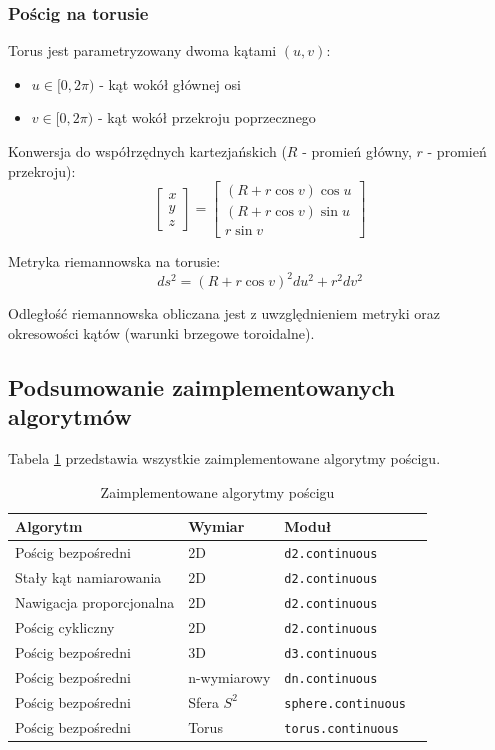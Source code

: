 \documentclass[12pt,a4paper]{article}
\begin{document}
\subsubsection{Pościg na torusie}

Torus jest parametryzowany dwoma kątami $(u, v)$:
\begin{itemize}
    \item $u \in [0, 2\pi)$ - kąt wokół głównej osi
    \item $v \in [0, 2\pi)$ - kąt wokół przekroju poprzecznego
\end{itemize}

Konwersja do współrzędnych kartezjańskich ($R$ - promień główny, $r$ - promień przekroju):
\begin{equation}
\begin{bmatrix} x \\ y \\ z \end{bmatrix} = \begin{bmatrix} (R + r\cos v) \cos u \\ (R + r\cos v) \sin u \\ r \sin v \end{bmatrix}
\end{equation}

Metryka riemannowska na torusie:
\begin{equation}
ds^2 = (R + r\cos v)^2 du^2 + r^2 dv^2
\end{equation}

Odległość riemannowska obliczana jest z uwzględnieniem metryki oraz okresowości kątów (warunki brzegowe toroidalne).

\subsection{Podsumowanie zaimplementowanych algorytmów}

Tabela \ref{tab:algorithms} przedstawia wszystkie zaimplementowane algorytmy pościgu.

\begin{table}[H]
\centering
\caption{Zaimplementowane algorytmy pościgu}
\label{tab:algorithms}
\begin{tabular}{@{}llll@{}}
\toprule
\textbf{Algorytm} & \textbf{Wymiar} & \textbf{Moduł} \\ \midrule
Pościg bezpośredni & 2D & \texttt{d2.continuous} \\
Stały kąt namiarowania & 2D & \texttt{d2.continuous} \\
Nawigacja proporcjonalna & 2D & \texttt{d2.continuous} \\
Pościg cykliczny & 2D & \texttt{d2.continuous} \\
Pościg bezpośredni & 3D & \texttt{d3.continuous} \\
Pościg bezpośredni & n-wymiarowy & \texttt{dn.continuous} \\
Pościg bezpośredni & Sfera $S^2$ & \texttt{sphere.continuous} \\
Pościg bezpośredni & Torus & \texttt{torus.continuous} \\ \bottomrule
\end{tabular}
\end{table}
\end{document}
